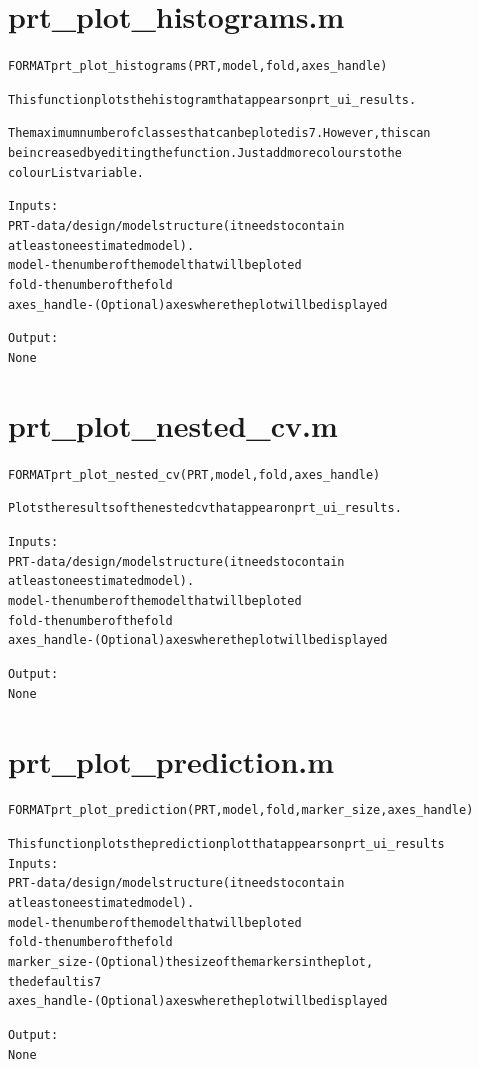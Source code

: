 \section{prt\_plot\_histograms.m}
\begin{alltt}

 FORMAT prt\_plot\_histograms(PRT, model, fold, axes\_handle)
 
 This function plots the histogram that appears on prt\_ui\_results.
 
 The maximum number of classes that can be ploted is 7. However, this can
 be increased by editing the function. Just add more colours to the
 colourList variable.
 
 Inputs:
       PRT             - data/design/model structure (it needs to contain
                         at least one estimated model).
       model           - the number of the model that will be ploted
       fold            - the number of the fold
       axes\_handle     - (Optional) axes where the plot will be displayed
 
 Output:
       None
\end{alltt}


\section{prt\_plot\_nested\_cv.m}
\begin{alltt}

 FORMAT prt\_plot\_nested\_cv(PRT, model, fold, axes\_handle)
 
 Plots the results of the nested cv that appear on prt\_ui\_results.
 
 
 Inputs:
       PRT             - data/design/model structure (it needs to contain
                         at least one estimated model).
       model           - the number of the model that will be ploted
       fold            - the number of the fold
       axes\_handle     - (Optional) axes where the plot will be displayed
 
 Output:
       None
\end{alltt}


\section{prt\_plot\_prediction.m}
\begin{alltt}

 FORMAT prt\_plot\_prediction(PRT, model, fold, marker\_size, axes\_handle)
 
 This function plots the prediction plot that appears on prt\_ui\_results
 Inputs:
       PRT             - data/design/model structure (it needs to contain
                         at least one estimated model).
       model           - the number of the model that will be ploted
       fold            - the number of the fold
       marker\_size     - (Optional) the size of the markers in the plot,
                         the default is 7
       axes\_handle     - (Optional) axes where the plot will be displayed
 
 Output:
       None
\end{alltt}


